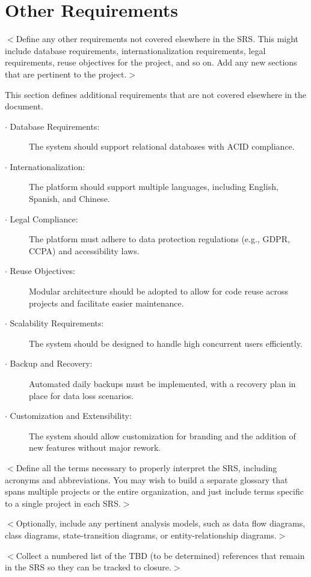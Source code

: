 \documentclass[a4paper, 11pt]{scrreprt}
\begin{document}
\chapter{Other Requirements}
$<$Define any other requirements not covered elsewhere in the SRS. This might 
include database requirements, internationalization requirements, legal 
requirements, reuse objectives for the project, and so on. Add any new sections 
that are pertinent to the project.$>$

This section defines additional requirements that are not covered elsewhere in the document.

\begin{description}
    \item[$\cdot$ Database Requirements:] The system should support relational databases with ACID compliance.
    \item[$\cdot$ Internationalization:] The platform should support multiple languages, including English, Spanish, and Chinese.
    \item[$\cdot$ Legal Compliance:] The platform must adhere to data protection regulations (e.g., GDPR, CCPA) and accessibility laws.
    \item[$\cdot$ Reuse Objectives:] Modular architecture should be adopted to allow for code reuse across projects and facilitate easier maintenance.
    \item[$\cdot$ Scalability Requirements:] The system should be designed to handle high concurrent users efficiently.
    \item[$\cdot$ Backup and Recovery:] Automated daily backups must be implemented, with a recovery plan in place for data loss scenarios.
    \item[$\cdot$ Customization and Extensibility:] The system should allow customization for branding and the addition of new features without major rework.
\end{description}

$<$Define all the terms necessary to properly interpret the SRS, including 
acronyms and abbreviations. You may wish to build a separate glossary that spans 
multiple projects or the entire organization, and just include terms specific to 
a single project in each SRS.$>$

$<$Optionally, include any pertinent analysis models, such as data flow 
diagrams, class diagrams, state-transition diagrams, or entity-relationship 
diagrams.$>$

$<$Collect a numbered list of the TBD (to be determined) references that remain 
in the SRS so they can be tracked to closure.$>$
\end{document}
